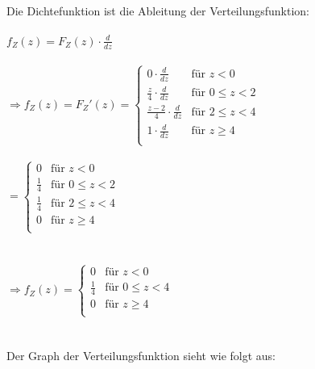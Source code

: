 \documentclass[a4paper]{article}
\begin{document}
Die Dichtefunktion ist die Ableitung der Verteilungsfunktion:\\\\
$f_Z(z) = F_Z(z) \cdot \frac{d}{dz}$\\\\
\(\Rightarrow f_Z(z) = F_Z'(z) = \begin{cases}
        0 \cdot \frac{d}{dz} & \text{für } z < 0 \\
        \frac{z}{4} \cdot \frac{d}{dz} & \text{für } 0 \leq z < 2 \\
        \frac{z - 2}{4} \cdot \frac{d}{dz} & \text{für } 2 \leq z < 4 \\
        1 \cdot \frac{d}{dz} & \text{für } z \geq 4 \\
\end{cases}\)\\\\
\hspace*{2.77cm}\(= \begin{cases}
        0 & \text{für } z < 0 \\
        \frac{1}{4} & \text{für } 0 \leq z < 2 \\
        \frac{1}{4} & \text{für } 2 \leq z < 4 \\
        0 & \text{für } z \geq 4 \\
\end{cases}\)\\\\\\
\(\Rightarrow f_Z(z) = \begin{cases}
        0 & \text{für } z < 0 \\
        \frac{1}{4} & \text{für } 0 \leq z < 4 \\
        0 & \text{für } z \geq 4 \\
\end{cases}\)\\\\\\
Der Graph der Verteilungsfunktion sieht wie folgt aus:\\
\\
\end{document}

